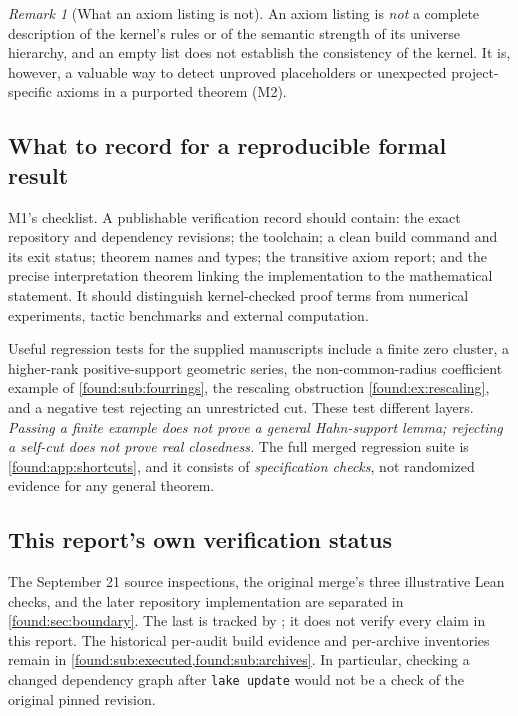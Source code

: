 \documentclass[11pt,letterpaper]{article}
\numberwithin{equation}{section}
\theoremstyle{definition}
\theoremstyle{remark}
\newtheorem{remark}[theorem]{Remark}
\begin{document}
\begin{remark}[What an axiom listing is not]\label{found:rem:axiomlisting}
An axiom listing is \emph{not} a complete description of the kernel's rules or
of the semantic strength of its universe hierarchy, and an empty list does not
establish the consistency of the kernel. It is, however, a valuable way to
detect unproved placeholders or unexpected project-specific axioms in a
purported theorem (M2).
\end{remark}

\subsection{What to record for a reproducible formal result}
\label{found:sub:reproducible}
M1's checklist. A publishable verification record should contain: the exact
repository and dependency revisions; the toolchain; a clean build command and
its exit status; theorem names and types; the transitive axiom report; and the
precise interpretation theorem linking the implementation to the mathematical
statement. It should distinguish kernel-checked proof terms from numerical
experiments, tactic benchmarks and external computation.

Useful regression tests for the supplied manuscripts include a finite zero
cluster, a higher-rank positive-support geometric series, the non-common-radius
coefficient example of \cref{found:sub:fourrings}, the rescaling obstruction
\cref{found:ex:rescaling}, and a negative test rejecting an unrestricted cut.
These test different layers. \emph{Passing a finite example does not prove a
general Hahn-support lemma; rejecting a self-cut does not prove real
closedness.} The full merged regression suite is
\cref{found:app:shortcuts}, and it consists of \emph{specification checks}, not
randomized evidence for any general theorem.

\subsection{This report's own verification status}
\label{found:sub:ownstatus}
The September 21 source inspections, the original merge's three illustrative
Lean checks, and the later repository implementation are separated in
\cref{found:sec:boundary}. The last is tracked by
; it does not verify every claim in this report.
The historical per-audit build evidence and per-archive inventories remain in
\cref{found:sub:executed,found:sub:archives}. In particular, checking a changed
dependency graph after \texttt{lake update} would not be a check of the original
pinned revision.
\end{document}
